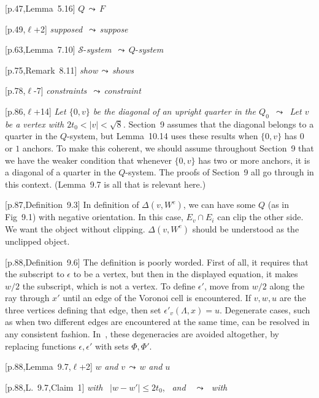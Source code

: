 \documentclass[11pt]{amsart}
\def\lto{\ensuremath{\,\leadsto\,}}
\def\line{$\ell$}
\def\text{\hbox}
\def\sz{small} %
\def\rmx{\rm}
\begin{document}
\begin{\sz}
\baselineskip

[p.47,Lemma~5.16] $Q\lto F$

[p.49,\line+2] {\it supposed} \lto {\it suppose}
	
[p.63,Lemma~7.10]
	${\mathcal S}$-{\it system} \lto $Q$-{\it system}
	


[p.75,Remark~8.11]
	{\it show}\lto {\it shows}

[p.78,\line-7] {\it constraints} \lto{\it  constraint}

[p.86,\line+14] {\it Let $\{0,v\}$ be 
          the diagonal of an upright quarter in the $Q_0$
        \lto
       Let $v$ be a vertex with $2t_0<|v|<\sqrt8$.}
           {\rmx Section~9 assumes that the diagonal belongs to
          a quarter in the $Q$-system, but Lemma~10.14 uses these
          results when $\{0,v\}$ has $0$ or $1$ anchors.  To make
          this coherent, we should assume throughout Section~9 that
          we have the weaker condition that whenever $\{0,v\}$ has
          two or more anchors, it is a diagonal of a quarter in the $Q$-system.
          The proofs of Section~9 all go through in this context.
           (Lemma~9.7 is all that is relevant here.)}

[p.87,Definition~9.3]
	{\rmx In definition of $\Delta(v,W^e)$, we
	can have some $Q$ (as in Fig~9.1)
	with negative orientation.
	In this case, $E_v\cap E_i$ can clip
	the other side.  We want the object
	without clipping.   $\Delta(v,W^e)$ should be understood as the
        unclipped object.}
	
[p.88,Definition~9.6]
	{\rmx The definition is poorly worded.  First of
	all, it requires that the subscript to
	$\epsilon$ to be a vertex, but then in
	the displayed equation, it makes $w/2$ the
	subscript, which is not a vertex.   To
	define $\epsilon'$, move from $w/2$ along
	the ray through $x'$ until an edge of the
	Voronoi cell is encountered.  If $v,w,u$
	are the three vertices defining that edge,
	then set $\epsilon'_v(\Lambda,x)=u$.
	Degenerate cases, such as when two different
	edges are encountered at the same time,
	can be resolved in any consistent fashion.  In~\cite{hales:2008:collection},
      these degeneracies are avoided altogether, by replacing functions 
      $\epsilon,\epsilon'$ with sets $\Phi,\Phi'$.
     }
	
[p.88,Lemma~9.7,\line+2] 
	$w$ {\it  and}  $v$\lto $w$ {\it and}  $u$

	
[p.88,L.~9.7,Claim~1]
	\text{{\it  with }} $|w - w'|\le 2t_0$, \text{ {\it and} }
	\lto \text{ {\it with} }


\end{\sz}
\end{document}
